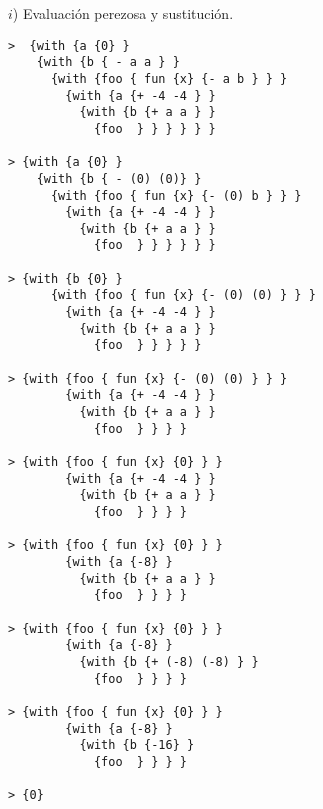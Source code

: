 $i$) Evaluación perezosa y sustitución. \newline

\begin{lstlisting}
>  {with {a {0} }
    {with {b { - a a } }
      {with {foo { fun {x} {- a b } } }
        {with {a {+ -4 -4 } }
          {with {b {+ a a } }
            {foo  } } } } } }

> {with {a {0} }
    {with {b { - (0) (0)} }
      {with {foo { fun {x} {- (0) b } } }
        {with {a {+ -4 -4 } }
          {with {b {+ a a } }
            {foo  } } } } } }

> {with {b {0} }
      {with {foo { fun {x} {- (0) (0) } } }
        {with {a {+ -4 -4 } }
          {with {b {+ a a } }
            {foo  } } } } }

> {with {foo { fun {x} {- (0) (0) } } }
        {with {a {+ -4 -4 } }
          {with {b {+ a a } }
            {foo  } } } }

> {with {foo { fun {x} {0} } }
        {with {a {+ -4 -4 } }
          {with {b {+ a a } }
            {foo  } } } }

> {with {foo { fun {x} {0} } }
        {with {a {-8} }
          {with {b {+ a a } }
            {foo  } } } }

> {with {foo { fun {x} {0} } }
        {with {a {-8} }
          {with {b {+ (-8) (-8) } }
            {foo  } } } }

> {with {foo { fun {x} {0} } }
        {with {a {-8} }
          {with {b {-16} }
            {foo  } } } }

> {0}
\end{lstlisting}

